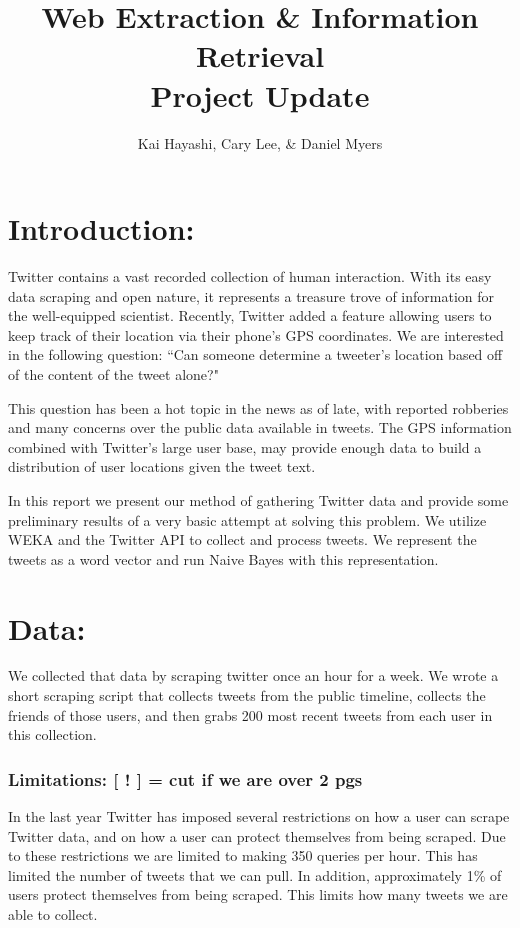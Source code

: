 \documentclass[12pt]{article}
\title{Web Extraction \& Information Retrieval \\ Project Update}
\author{Kai Hayashi, Cary Lee, \& Daniel Myers}
\date{}                                           %
\begin{document}
\maketitle
\section*{Introduction:}
Twitter contains a vast recorded collection of human interaction. With its easy data scraping and open nature, it represents a treasure trove of information for the well-equipped scientist. Recently, Twitter added a feature allowing users to keep track of their location via their phone's GPS coordinates. We are interested in the following question: ``Can someone determine a tweeter's location based off of the content of the tweet alone?"

This question has been a hot topic in the news as of late, with reported robberies and many concerns over the public data available in tweets. The GPS information combined with Twitter's large user base, may provide enough data to build a distribution of user locations given the tweet text. 

In this report we present our method of gathering Twitter data and provide some preliminary results of a very basic attempt at solving this problem. We utilize WEKA and the Twitter API to collect and process tweets. We represent the tweets as a word vector and run Naive Bayes with this representation.

\section*{Data:}
We collected that data by scraping twitter once an hour for a week. We wrote a short scraping script that collects tweets from the public timeline, collects the friends of those users, and then grabs 200 most recent tweets from each user in this collection. 

\subsubsection*{Limitations: [ ! ] = cut if we are over 2 pgs}
In the last year Twitter has imposed several restrictions on how a user can scrape Twitter data, and on how a user can protect themselves from being scraped. Due to these restrictions we are limited to making 350 queries per hour. This has limited the number of tweets that we can pull. In addition, approximately 1\% of users protect themselves from being scraped. This limits how many tweets we are able to collect. 
\end{document}
